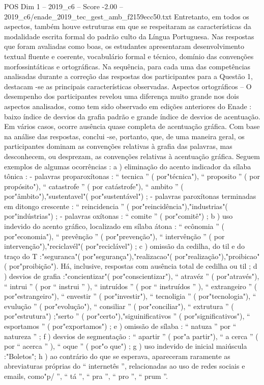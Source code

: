 \begin{textsample}{POS Dim 1 – 2019\_c6 – Score -2.00 – 2019\_c6/enade\_2019\_tec\_gest\_amb\_f2159ecc50.txt}
Entretanto, em todos os aspectos, também houve estruturas em que se respeitaram as características da modalidade escrita formal do padrão culto da Língua Portuguesa.
Nas respostas que foram avaliadas como boas, os estudantes apresentaram desenvolvimento textual fluente e coerente, vocabulário formal e técnico, domínio das convenções morfossintáticas e ortográficas.
Na sequência, para cada uma das competências analisadas durante a correção das respostas dos participantes para a Questão 1, destacam -se as principais características observadas.
Aspectos ortográficos – O desempenho dos participantes revelou uma diferença muito grande nos dois aspectos analisados, como tem sido observado em edições anteriores do Enade : baixo índice de desvios da grafia padrão e grande índice de desvios de acentuação.
Em vários casos, ocorre ausência quase completa de acentuação gráfica.
Com base na análise das respostas, conclui -se, portanto, que, de uma maneira geral, os participantes dominam as convenções relativas à grafia das palavras, mas desconhecem, ou desprezam, as convenções relativas à acentuação gráfica.
Seguem exemplos de algumas ocorrências : a ) eliminação do acento indicador da sílaba tônica : - palavras proparoxítonas : “ tecnica ” ( por"técnica"), “ proposito ” ( por propósito"), “ catastrofe ” ( por catástrofe"), “ ambito ” ( por"âmbito"),"sustentavel"( por"sustentável") ; - palavras paroxítonas terminadas em ditongo crescente : “ reincidencia ” ( por"reincidência"),"industrias"( por"indústrias") ; - palavras oxítonas : “ comite ” ( por"comitê") ; b ) uso indevido do acento gráfico, localizado em sílaba átona : “ ecônomia ” ( por"economia"), “ prevênção ” ( por"prevenção"), “ intervênção ” ( por intervenção"),"reciclavél"( por"reciclável") ; c ) omissão da cedilha, do til e do traço do T :"seguranca"( por"segurança"),"realizacao"( por"realização"),"proibicao"( por"proibição").
Há, inclusive, respostas com ausência total de cedilha ou til ; d ) desvios de grafia :"concientizar"( por"conscientizar"), “ atravéz ” ( por"através"), “ intrui ” ( por “ instrui ” ), “ intruídos ” ( por “ instruídos ” ), “ extrangeiro ” ( por"estrangeiro"), “ envestir ” ( por"investir"), “ tecnoligia ” ( por"tecnologia"), “ evulução ” ( por"evolução"), “ consiliar ” ( por"conciliar"), “ extrutura ” ( por"estrutura") ;"serto ” ( por"certo"),"siguinificativos ” ( por"significativos"), “ esportamos ” ( por"exportamos") ; e ) omissão de sílaba : “ natuza ” por “ natureza ” ; f ) desvios de segmentação : “ apartir ” ( por"a partir"), “ a cerca ” ( por “ acerca ” ), “ oque ” ( por"o que") ; g ) uso indevido de inicial maiúscula :"Boletos"; h ) ao contrário do que se esperava, apareceram raramente as abreviaturas próprias do “ internetês ”, relacionadas ao uso de redes sociais e emails, como"p/ ”, “ tá ”, “ pra ”, “ pro ”, “ prum ”.

\end{textsample}
